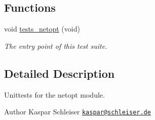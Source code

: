 \subsection*{Functions}
\begin{DoxyCompactItemize}
\item 
void \hyperlink{group__unittests_gaf3cee24f6368b87755b19538a4f1564c}{tests\+\_\+netopt} (void)
\begin{DoxyCompactList}\small\item\em The entry point of this test suite. \end{DoxyCompactList}\end{DoxyCompactItemize}


\subsection{Detailed Description}
Unittests for the {\ttfamily netopt} module. 

\begin{DoxyAuthor}{Author}
Kaspar Schleiser \href{mailto:kaspar@schleiser.de}{\tt kaspar@schleiser.\+de} 
\end{DoxyAuthor}
